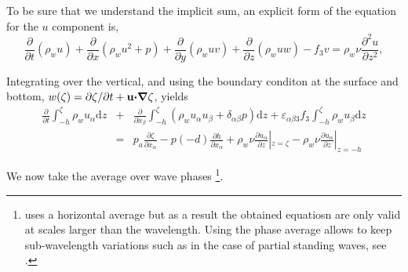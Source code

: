 To be sure that we understand the implicit sum, an explicit form of the equation for the $u$ component is, 
\begin{equation}
 \frac{\partial }{\partial t} \left(\rho_w u\right)+ \frac{\partial }{\partial x} 
\left(\rho_w u^2  + p  \right) + \frac{\partial }{\partial y} 
\left(\rho_w uv \right)
+ \frac{\partial }{\partial z} \left(\rho_w u w \right)  - f_3 v = \rho_w \nu \frac{\partial^2 u}{\partial z^2},\label{NavierStokes_horiz_exp}
\end{equation}

Integrating over the vertical, and using the boundary conditon at the surface and bottom, 
$w(\zeta)=\partial \zeta/\partial t + \mathbf{u} \mbox{\boldmath $\cdot$} \mbox{\boldmath $\nabla$} \zeta$, yields 
\begin{eqnarray}
 \frac{\partial }{\partial t} \int_{-h}^{\zeta} \rho_w u_\alpha \mathrm{d} z 
&+ &\frac{\partial }{\partial x_\beta}\int_{-h}^{\zeta}  \left(\rho_w u_\alpha u_\beta  + 
\delta_{\alpha \beta} p\right)   \mathrm{d} z +
\varepsilon_{\alpha \beta 3} f_3 \int_{-h}^{\zeta} \rho_w u_\beta \mathrm{d} z  \nonumber \\
&=&p_a \frac{\partial \zeta}{\partial x_\alpha} - p(-d)\frac{\partial h}{\partial x_\alpha}  + \rho_w \nu \frac{\partial u_\alpha}{\partial z}|_{z=\zeta} - \rho_w \nu \frac{\partial u_\alpha}{\partial z}|_{z=-h} \label{Phillips1}
\end{eqnarray}

We now take the average over wave phases \footnote{\cite{Phillips1977} uses a horizontal average 
but as a result the obtained equatiosn are only valid at scales larger than the wavelength. Using the phase average allows to keep 
sub-wavelength variations such as in the case of partial standing waves, see \cite{Ardhuin&al.2008}.}. 

